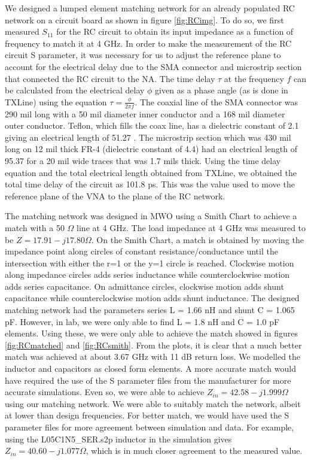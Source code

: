 \documentclass[twocolumn, aps, apl]{revtex4-1}
\begin{document}
We designed a lumped element matching network for an already populated RC network on a circuit board as shown in figure \ref{fig:RCimg}. To do so, we first measured $S_{11}$ for the RC circuit to obtain its input impedance as a function of frequency to match it at 4 GHz. In order to make the measurement of the RC circuit S parameter, it was necessary for us to adjust the reference plane to account for the electrical delay due to the SMA connector and microstrip section that connected the RC circuit to the NA. The time delay $\tau$ at the frequency $f$ can be calculated from the electrical delay $\phi$ given as a phase angle (as is done in TXLine) using the equation $\tau = \frac{\phi}{2 \pi f}$. The coaxial line of the SMA connector was 290 mil long with a 50 mil diameter inner conductor and a 168 mil diameter outer conductor. Teflon, which fills the coax line, has a dielectric constant of 2.1 giving an electrical length of 51.27 \textdegree. The microstrip section which was 430 mil long on 12 mil thick FR-4 (dielectric constant of 4.4) had an electrical length of 95.37 \textdegree for a 20 mil wide traces that was 1.7 mils thick. Using the time delay equation and the total electrical length obtained from TXLine, we obtained the total time delay of the circuit as 101.8 ps. This was the value used to move the reference plane of the VNA to the plane of the RC network.

The matching network was designed in MWO using a Smith Chart to achieve a match with a 50 $\Omega$ line at 4 GHz. The load impedance at 4 GHz was measured to be $Z = 17.91 - j 17.80 \Omega$. On the Smith Chart, a match is obtained by moving the impedance point along circles of constant resistance/conductance until the intersection with either the r=1 or the y=1 circle is reached. Clockwise motion along impedance circles adds series inductance while counterclockwise motion adds series capacitance. On admittance circles, clockwise motion adds shunt capacitance while counterclockwise motion adds shunt inductance. The designed matching network had the parameters series L = 1.66 nH and shunt C = 1.065 pF. However, in lab, we were only able to find L = 1.8 nH and C = 1.0 pF elements. Using these, we were only able to achieve the match showed in figures \ref{fig:RCmatched} and \ref{fig:RCsmith}. From the plots, it is clear that a much better match was achieved at about 3.67 GHz with 11 dB return loss. We modelled the inductor and capacitors as closed form elements. A more accurate match would have required the use of the S parameter files from the manufacturer for more accurate simulations. Even so, we were able to achieve $Z_{in} = 42.58 -j 1.999 \Omega $ using our matching network. We were able to suitably match the network, albeit at lower than design frequencies. For better match, we would have used the S parameter files for more agreement between simulation and data. For example, using the L\-05C1N5\_SER.s2p inductor in the simulation gives $Z_{in} = 40.60 - j 1.077 \Omega$, which is in much closer agreement to the measured value.
\end{document}
